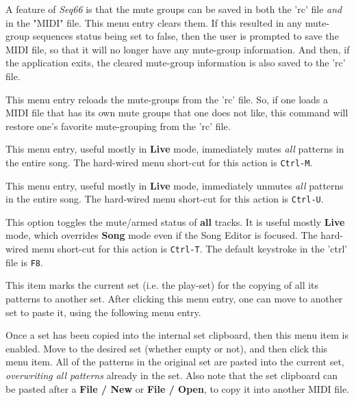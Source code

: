    A feature of \textsl{Seq66} is that the mute groups
   can be saved in both the 'rc' file \textsl{and} in the "MIDI" file.
   This menu entry clears them. If this resulted in any mute-group sequences
   status being set to false, then the user is prompted to save the MIDI
   file, so that it will no longer have any
   mute-group information.  And then, if the
   application exits, the cleared mute-group information is also saved to
   the 'rc' file.

   This menu entry reloads the mute-groups from the 'rc' file.
   So, if one loads a MIDI file that has its own mute groups that one does not
   like, this command will restore one's favorite mute-grouping from the 'rc'
   file.

   This menu entry, useful mostly in \textbf{Live} mode,
   immediately mutes \textsl{all} patterns in the entire song.
   The hard-wired menu short-cut for this action is \texttt{Ctrl-M}.

   This menu entry, useful mostly in \textbf{Live} mode,
   immediately unmutes \textsl{all} patterns in the entire song.
   The hard-wired menu short-cut for this action is \texttt{Ctrl-U}.

   This option toggles the mute/armed status of \textbf{all} tracks.
   It is useful mostly \textbf{Live} mode, which overrides \textbf{Song}
   mode even if the Song Editor is focused.
   The hard-wired menu short-cut for this action is \texttt{Ctrl-T}.
   The default keystroke in the 'ctrl' file is \texttt{F8}.

   This item marks the current set (i.e. the play-set)
   for the copying of all its patterns to another set.
   After clicking this menu entry, one can move to another set to paste it,
   using the following menu entry.

   Once a set has been copied into the internal set clipboard,
   then this menu item is enabled.
   Move to the desired set (whether empty or not), and then
   click this menu item.
   All of the patterns in the original set are pasted into the current set,
   \textsl{overwriting all patterns} already in the set.
   Also note that the set clipboard can be pasted after a
   \textbf{File / New} or \textbf{File / Open},
   to copy it into another MIDI file.

